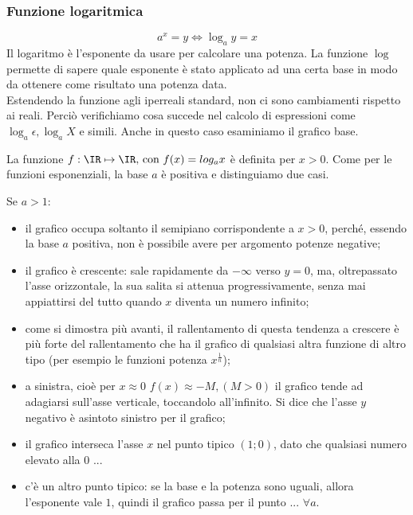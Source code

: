 \subsubsection{Funzione logaritmica}
\label{subsubsec:insnum_log}
\[
 a^x=y \Leftrightarrow \log_a{y}=x
\]
Il logaritmo è l'esponente da usare per calcolare una potenza.
La funzione \(\log\) permette di sapere quale esponente è stato applicato
ad una certa base in modo da ottenere come risultato una potenza data.\\
Estendendo la funzione agli iperreali standard, non ci sono cambiamenti rispetto 
ai reali. Perciò verifichiamo cosa succede nel calcolo di espressioni come
$\log_a \epsilon, \log_a X$ e simili. Anche in questo caso esaminiamo il
grafico base.

La funzione \(f:\IR\mapsto \IR \text{, con } f(x)= log_a x\)
è definita per \(x>0\). Come per le funzioni esponenziali, 
la base \(a\) è positiva e distinguiamo due casi.













Se $a>1$:
\begin{itemize} [noitemsep]
 \item 
il grafico occupa soltanto il semipiano corrispondente a $x>0$, perché,
essendo la base $a$ positiva, non è possibile avere per argomento potenze
negative;
 \item
il grafico è crescente: sale rapidamente da $-\infty$ verso $y=0$, ma, oltrepassato
l'asse orizzontale, la sua salita si attenua progressivamente, 
senza mai appiattirsi del tutto quando $x$ diventa un numero infinito; 
 \item 
come si dimostra più avanti, il rallentamento di questa tendenza a crescere
è più forte del rallentamento che ha il grafico di qualsiasi altra
funzione di altro tipo (per esempio le funzioni potenza $x^{\frac{1}{n}}$);
 \item
a sinistra, cioè per $x\approx 0$ $f(x)\approx -M, (M>0)$ il grafico tende 
ad adagiarsi sull'asse verticale, toccandolo all'infinito. Si dice che l'asse
$y$ negativo è asintoto sinistro per il grafico;
 \item
il grafico interseca l'asse $x$ nel punto tipico $(1;0)$, dato che qualsiasi numero
elevato alla 0 ...
 \item
c'è un altro punto tipico: se la base e la potenza sono uguali, allora 
l'esponente vale $1$, quindi il grafico passa per il punto ... $\forall a$.
\end{itemize}

